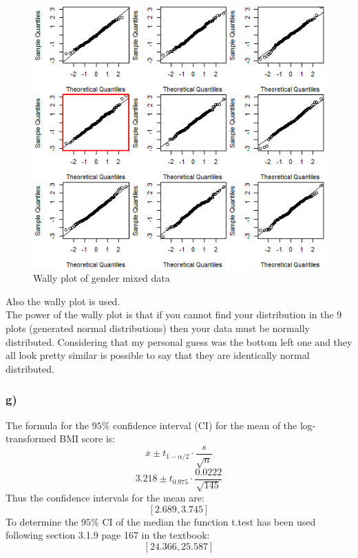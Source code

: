 \begin{figure}[h]
    \centering
    \includegraphics[scale=1]{root/Rplot.png}
    \caption{Wally plot of gender mixed data}
    \label{allWally}
\end{figure}
Also the wally plot is used. \\
The power of the wally plot is that if you cannot find your distribution in the 9 plots (generated normal distributions) then your data must be normally distributed. Considering that my personal guess was the bottom left one and they all look pretty similar is possible to say that they are identically normal distributed.

\subsubsection{g)}
The formula for the $95\%$ confidence interval (CI) for the mean of the log-transformed BMI score is: 
\[ \overline{x} \pm t_{1-\alpha/2} \cdot \frac{s}{\sqrt{n}}\]
\[ 3.218 \pm t_{0.975} \cdot \frac{0.0222}{\sqrt{145}}\]
Thus the confidence intervals for the mean are:
\[  [2.689,3.745] \]
To determine the $95\%$ CI of the median the function t.test has been used following section 3.1.9 page 167 in the textbook:
\[  [24.366,25.587] \]

